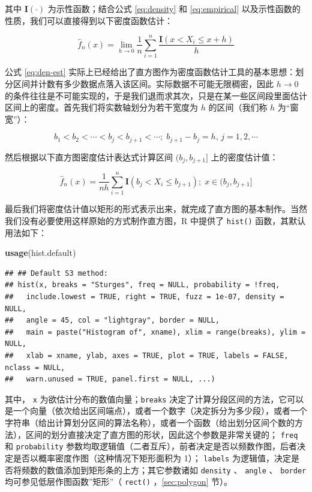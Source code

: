 \documentclass[
  b5paper,
  UTF8,twoside]{book}
\newenvironment{Shaded}{\begin{snugshade}}{\end{snugshade}}
\newcommand{\FunctionTok}[1]{\textcolor[rgb]{0.13,0.29,0.53}{\textbf{#1}}}
\newcommand{\NormalTok}[1]{#1}
\begin{document}
其中 \(\mathbf{I}(\cdot)\) 为示性函数；结合公式 \eqref{eq:density} 和 \eqref{eq:empirical} 以及示性函数的性质，我们可以直接得到以下密度函数估计：

\begin{equation} 
\hat{f}_{n}(x)=\lim_{h\rightarrow0}\frac{1}{n}\sum_{i=1}^{n}\frac{\mathbf{I}(x<X_{i}\leq x+h)}{h}
\label{eq:den-est}
\end{equation}

公式 \eqref{eq:den-est} 实际上已经给出了直方图作为密度函数估计工具的基本思想：划分区间并计数有多少数据点落入该区间。实际数据不可能无限稠密，因此 \(h\rightarrow0\) 的条件往往是不可能实现的，于是我们退而求其次，只是在某一些区间段里面估计区间上的密度。首先我们将实数轴划分为若干宽度为 \(h\) 的区间（我们称 \(h\) 为``窗宽''）：

\begin{equation} 
b_{1}<b_{2}<\cdots<b_{j}<b_{j+1}<\cdots;\;b_{j+1}-b_{j}=h,\,j=1,2,\cdots
\label{eq:den-est2}
\end{equation}

然后根据以下直方图密度估计表达式计算区间 \((b_j,b_{j+1}]\) 上的密度估计值：

\begin{equation} 
\hat{f}_{n}(x)=\frac{1}{nh}\sum_{i=1}^{n}\mathbf{I}(b_{j}<X_{i}\leq b_{j+1});\;x\in(b_{j},b_{j+1}]
\label{eq:den-formula}
\end{equation}

最后我们将密度估计值以矩形的形式表示出来，就完成了直方图的基本制作。当然我们没有必要使用这样原始的方式制作直方图，R 中提供了 \texttt{hist()} 函数，其默认用法如下：

\begin{Shaded}
\begin{Highlighting}[]
\FunctionTok{usage}\NormalTok{(hist.default)}
\end{Highlighting}
\end{Shaded}

\begin{verbatim}
## ## Default S3 method:
## hist(x, breaks = "Sturges", freq = NULL, probability = !freq,
##   include.lowest = TRUE, right = TRUE, fuzz = 1e-07, density = NULL,
##   angle = 45, col = "lightgray", border = NULL,
##   main = paste("Histogram of", xname), xlim = range(breaks), ylim = NULL,
##   xlab = xname, ylab, axes = TRUE, plot = TRUE, labels = FALSE, nclass = NULL,
##   warn.unused = TRUE, panel.first = NULL, ...)
\end{verbatim}

其中， \texttt{x} 为欲估计分布的数值向量；\texttt{breaks} 决定了计算分段区间的方法，它可以是一个向量（依次给出区间端点），或者一个数字（决定拆分为多少段），或者一个字符串（给出计算划分区间的算法名称），或者一个函数（给出划分区间个数的方法），区间的划分直接决定了直方图的形状，因此这个参数是非常关键的； \texttt{freq} 和 \texttt{probability} 参数均取逻辑值（二者互斥），前者决定是否以频数作图，后者决定是否以概率密度作图（这种情况下矩形面积为 1）； \texttt{labels} 为逻辑值，决定是否将频数的数值添加到矩形条的上方；其它参数诸如 \texttt{density} 、 \texttt{angle} 、 \texttt{border} 均可参见低层作图函数''矩形''（ \texttt{rect()} ，\ref{sec:polygon} 节）。
\end{document}
